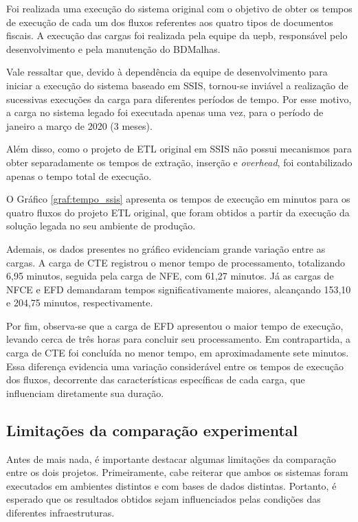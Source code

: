Foi realizada uma execução do sistema original com o objetivo de obter os tempos de execução de cada
um dos fluxos referentes aos quatro tipos de documentos fiscais. A execução das cargas foi realizada
pela equipe da \gls{uepb}, responsável pelo desenvolvimento
e pela manutenção do BDMalhas.

Vale ressaltar que, devido à dependência da equipe de desenvolvimento para iniciar a execução do 
sistema baseado em SSIS, tornou-se inviável a realização de sucessivas execuções da carga 
para diferentes períodos de tempo. Por esse motivo, a carga no sistema legado foi executada apenas 
uma vez, para o período de janeiro a março de 2020 (3 meses).

Além disso, como o projeto de ETL original em SSIS não possui mecanismos para obter separadamente 
os tempos de extração, inserção e \textit{overhead}, foi contabilizado apenas o tempo total de 
execução.

O Gráfico \ref{graf:tempo_ssis} apresenta os tempos de execução em minutos para os quatro fluxos
do projeto ETL original, que foram obtidos a partir da execução da solução legada no seu ambiente de 
produção.

Ademais, os dados presentes no gráfico evidenciam grande variação entre as cargas. A carga de CTE 
registrou o menor tempo de processamento, totalizando 6,95 minutos, seguida pela carga de NFE, com 
61,27 minutos. Já as cargas de NFCE e EFD demandaram tempos significativamente maiores, alcançando 
153,10 e 204,75 minutos, respectivamente.

Por fim, observa-se que a carga de EFD apresentou o maior tempo de execução, levando cerca de três 
horas para concluir seu processamento. Em contrapartida, a carga de CTE foi concluída no menor 
tempo, em aproximadamente sete minutos. Essa diferença evidencia uma variação considerável entre os 
tempos de execução dos fluxos, decorrente das características específicas de cada carga, que 
influenciam diretamente sua duração.

\subsection{Limitações da comparação experimental}
\label{sec:limitacoes_comparacao}

Antes de mais nada, é importante destacar algumas limitações da comparação entre os dois projetos. 
Primeiramente, cabe reiterar que ambos os sistemas foram executados em ambientes distintos e com
bases de dados distintas. Portanto, é esperado que os resultados obtidos sejam influenciados pelas 
condições das diferentes infraestruturas.

